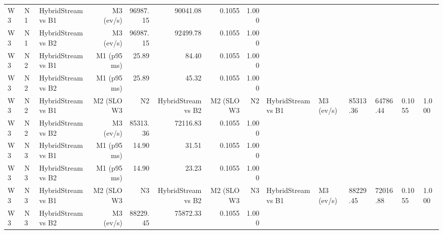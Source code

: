 \begin{table}[htbp]
\begin{tabular}{lllrrrrr}
W3 & N1 & HybridStream vs B1 & M3 (ev/s) & 96987.15 & 90041.08 & 0.1055 & 1.000 \\
W3 & N1 & HybridStream vs B2 & M3 (ev/s) & 96987.15 & 92499.78 & 0.1055 & 1.000 \\
W3 & N2 & HybridStream vs B1 & M1 (p95 ms) & 25.89 & 84.40 & 0.1055 & 1.000 \\
W3 & N2 & HybridStream vs B2 & M1 (p95 ms) & 25.89 & 45.32 & 0.1055 & 1.000 \\
W3 & N2 & HybridStream vs B1 & M2 (SLO %
W3 & N2 & HybridStream vs B2 & M2 (SLO %
W3 & N2 & HybridStream vs B1 & M3 (ev/s) & 85313.36 & 64786.44 & 0.1055 & 1.000 \\
W3 & N2 & HybridStream vs B2 & M3 (ev/s) & 85313.36 & 72116.83 & 0.1055 & 1.000 \\
W3 & N3 & HybridStream vs B1 & M1 (p95 ms) & 14.90 & 31.51 & 0.1055 & 1.000 \\
W3 & N3 & HybridStream vs B2 & M1 (p95 ms) & 14.90 & 23.23 & 0.1055 & 1.000 \\
W3 & N3 & HybridStream vs B1 & M2 (SLO %
W3 & N3 & HybridStream vs B2 & M2 (SLO %
W3 & N3 & HybridStream vs B1 & M3 (ev/s) & 88229.45 & 72016.88 & 0.1055 & 1.000 \\
W3 & N3 & HybridStream vs B2 & M3 (ev/s) & 88229.45 & 75872.33 & 0.1055 & 1.000 \\
\bottomrule
\end{tabular}
\end{table}